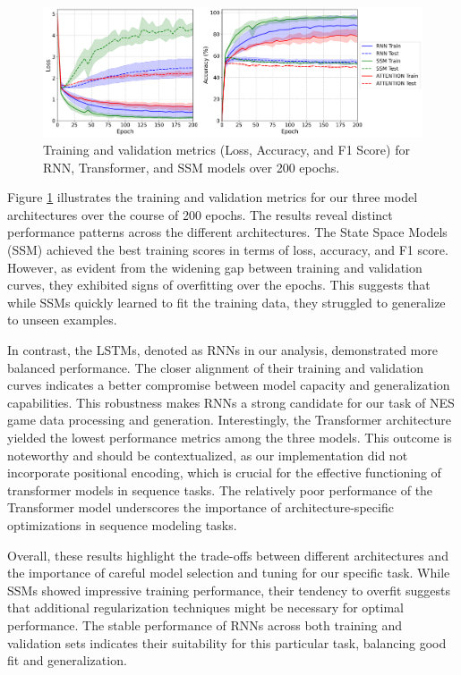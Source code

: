 \documentclass[10pt,a4paper]{article}
\begin{document}
\begin{figure}[htbp]
\centering
\includegraphics[width=\textwidth]{training_results.png}
\caption{Training and validation metrics (Loss, Accuracy, and F1 Score) for RNN, Transformer, and SSM models over 200 epochs.}
\label{fig:training_results}
\end{figure}

Figure \ref{fig:training_results} illustrates the training and validation metrics for our three model architectures over the course of 200 epochs. The results reveal distinct performance patterns across the different architectures. The State Space Models (SSM) achieved the best training scores in terms of loss, accuracy, and F1 score. However, as evident from the widening gap between training and validation curves, they exhibited signs of overfitting over the epochs. This suggests that while SSMs quickly learned to fit the training data, they struggled to generalize to unseen examples.

In contrast, the LSTMs, denoted as RNNs in our analysis, demonstrated more balanced performance. The closer alignment of their training and validation curves indicates a better compromise between model capacity and generalization capabilities. This robustness makes RNNs a strong candidate for our task of NES game data processing and generation. Interestingly, the Transformer architecture yielded the lowest performance metrics among the three models. This outcome is noteworthy and should be contextualized, as our implementation did not incorporate positional encoding, which is crucial for the effective functioning of transformer models in sequence tasks. The relatively poor performance of the Transformer model underscores the importance of architecture-specific optimizations in sequence modeling tasks.

Overall, these results highlight the trade-offs between different architectures and the importance of careful model selection and tuning for our specific task. While SSMs showed impressive training performance, their tendency to overfit suggests that additional regularization techniques might be necessary for optimal performance. The stable performance of RNNs across both training and validation sets indicates their suitability for this particular task, balancing good fit and generalization.
\end{document}
